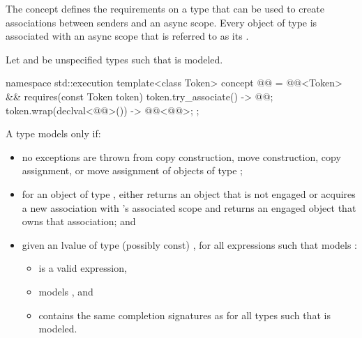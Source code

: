 \pnum
The  concept defines the requirements on
a type  that can be used to create associations
between senders and an async scope.
Every object of type  is associated with an async scope
that is referred to as its .

\pnum
Let  and 
be unspecified types such that
is modeled.

\begin{codeblock}
namespace std::execution {
  template<class Token>
    concept @@ =
      @@<Token> &&
      requires(const Token token) {
        { token.try_associate() } -> @@;
        { token.wrap(declval<@@>()) } -> @@<@@>;
      };
}
\end{codeblock}

\pnum
A type  models  only if:

\begin{itemize}
\item
no exceptions are thrown from
copy construction,
move construction,
copy assignment, or
move assignment
of objects of type ;

\item
for an object  of type ,
 either
returns an object that is not engaged or
acquires a new association with 's associated scope and
returns an engaged object that owns that association; and

\item
given an lvalue  of type (possibly const) ,
for all expressions  such that
 models :
  \begin{itemize}
  \item
   is a valid expression,
  \item
   models , and
  \item
  contains the same completion signatures as
  for all types  such that
   is modeled.
  \end{itemize}
\end{itemize}

